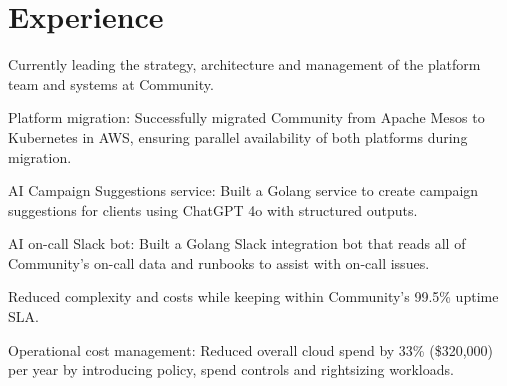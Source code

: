 \documentclass[]{resume}
\begin{document}
%
%

%
%

%
%

\begin{minipage}[t]{0.60\textwidth}

\section{Experience}
\vspace{\topsep} %
\begin{tightemize}
\item Currently leading the strategy, architecture and management of the platform team and systems at Community.
\item Platform migration: Successfully migrated Community from Apache Mesos to Kubernetes in AWS, ensuring parallel availability of both platforms during migration.
\item AI Campaign Suggestions service: Built a Golang service to create campaign suggestions for clients using ChatGPT 4o with structured outputs.
\item AI on-call Slack bot: Built a Golang Slack integration bot that reads all of Community’s on-call data and runbooks to assist with on-call issues.
\item Reduced complexity and costs while keeping within Community's 99.5\% uptime SLA.
\item Operational cost management: Reduced overall cloud spend by 33\% (\$320,000) per year by introducing policy, spend controls and rightsizing workloads.
\end{tightemize}
\sectionsep


\end{minipage}
\end{document}
